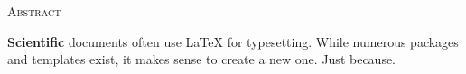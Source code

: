 \begin{center}
  \textsc{Abstract}
\end{center}
%
\noindent
%
\textbf{Scientific} documents often use \LaTeX{} for typesetting. While numerous
packages and templates exist, it makes sense to create a new one. Just
because.
